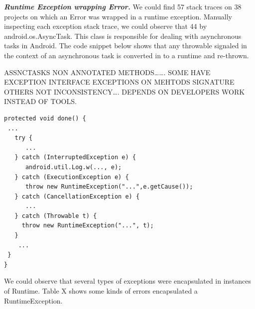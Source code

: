 \documentclass[conference]{IEEEtran}
\begin{document}


\emph{\textbf{Runtime Exception wrapping Error.}} We could find  57 stack traces 
on 38 projects on which an Error was wrapped in a runtime exception.
Manually inspecting each exception stack trace, we could observe that 44%
by android.os.AsyncTask. This class is responsible for dealing with asynchronous tasks in Android.
The code snippet below shows that any throwable signaled in the context of an asynchronous 
task is converted in to a runtime and re-thrown.

ASSNCTASKS NON ANNOTATED METHODS…….
SOME HAVE EXCEPTION INTERFACE 
EXCEPTIONS ON MEHTODS SIGNATURE OTHERS NOT
INCONSISTENCY…. DEPENDS ON DEVELOPERS 
WORK INSTEAD OF TOOLS.


{\footnotesize
\begin{verbatim}
protected void done() {
 ...
   try {
      ...
   } catch (InterruptedException e) {
      android.util.Log.w(..., e);
   } catch (ExecutionException e) {
      throw new RuntimeException("...",e.getCause());
   } catch (CancellationException e) {
      ...
   } catch (Throwable t) {
     throw new RuntimeException("...", t);
   }
    ...
 }
}
\end{verbatim}
}

We could observe that several types of exceptions were encapsulated in 
instances of Runtime. Table X shows some kinds of errors encapsulated a
RuntimeException.

\end{document}
